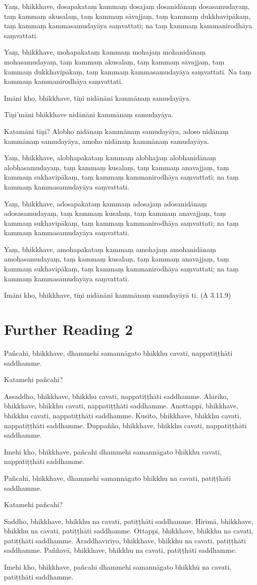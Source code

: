 Yaṃ, bhikkhave, dosapakataṃ kammaṃ dosajaṃ dosanidānaṃ dosasamudayaṃ, taṃ kammaṃ akusalaṃ, taṃ kammaṃ sāvajjaṃ, taṃ kammaṃ dukkhavipākaṃ, taṃ kammaṃ kammasamudayāya saṃvattati; na taṃ kammaṃ kammanirodhāya saṃvattati.

Yaṃ, bhikkhave, mohapakataṃ kammaṃ mohajaṃ mohanidānaṃ mohasamudayaṃ, taṃ kammaṃ akusalaṃ, taṃ kammaṃ sāvajjaṃ, taṃ kammaṃ dukkhavipākaṃ, taṃ kammaṃ kammasamudayāya saṃvattati. Na taṃ kammaṃ kammanirodhāya saṃvattati.

Imāni kho, bhikkhave, tīṇi nidānāni kammānaṃ samudayāya.

Tīṇi’māni bhikkhave nidānāni kammānaṃ samudayāya.

Katamāni tīṇi? Alobho nidānaṃ kammānaṃ samudayāya, adoso nidānaṃ kammānaṃ samudayāya, amoho nidānaṃ kammānaṃ samudayāya.

Yaṃ, bhikkhave, alobhapakataṃ kammaṃ alobhajaṃ alobhanidānaṃ alobhasamudayaṃ, taṃ kammaṃ kusalaṃ, taṃ kammaṃ anavajjaṃ, taṃ kammaṃ sukhavipākaṃ, taṃ kammaṃ kammanirodhāya saṃvattati; na taṃ kammaṃ kammasamudayāya saṃvattati.

Yaṃ, bhikkhave, adosapakataṃ kammaṃ adosajaṃ adosanidānaṃ adosasamudayaṃ, taṃ kammaṃ kusalaṃ, taṃ kammaṃ anavajjaṃ, taṃ kammaṃ sukhavipākaṃ, taṃ kammaṃ kammanirodhāya saṃvattati; na taṃ kammaṃ kammasamudayāya saṃvattati.

Yaṃ, bhikkhave, amohapakataṃ kammaṃ amohajaṃ amohanidānaṃ amohasamudayaṃ, taṃ kammaṃ kusalaṃ, taṃ kammaṃ anavajjaṃ, taṃ kammaṃ sukhavipākaṃ, taṃ kammaṃ kammanirodhāya saṃvattati; na taṃ kammaṃ kammasamudayāya saṃvattati.

Imāni kho, bhikkhave, tīṇi nidānāni kammānaṃ samudayāyā ti. \hfill(A 3.11.9)

\section*{Further Reading 2}

Pañcahi, bhikkhave, dhammehi samannāgato bhikkhu cavati, nappatiṭṭhāti saddhamme.

Katamehi pañcahi?

Assaddho, bhikkhave, bhikkhu cavati, nappatiṭṭhāti saddhamme. Ahiriko, bhikkhave, bhikkhu cavati, nappatiṭṭhāti saddhamme. Anottappī, bhikkhave, bhikkhu cavati, nappatiṭṭhāti saddhamme. Kusīto, bhikkhave, bhikkhu cavati, nappatiṭṭhāti saddhamme. Duppañño, bhikkhave, bhikkhu cavati, nappatiṭṭhāti saddhamme.

Imehi kho, bhikkhave, pañcahi dhammehi samannāgato bhikkhu cavati, nappatiṭṭhāti saddhamme.

Pañcahi, bhikkhave, dhammehi samannāgato bhikkhu na cavati, patiṭṭhāti saddhamme.

Katamehi pañcahi?

Saddho, bhikkhave, bhikkhu na cavati, patiṭṭhāti saddhamme. Hirimā, bhikkhave, bhikkhu na cavati, patiṭṭhāti saddhamme. Ottappī, bhikkhave, bhikkhu na cavati, patiṭṭhāti saddhamme. Āraddhaviriyo, bhikkhave, bhikkhu na cavati, patiṭṭhāti saddhamme. Paññavā, bhikkhave, bhikkhu na cavati, patiṭṭhāti saddhamme.

Imehi kho, bhikkhave, pañcahi dhammehi samannāgato bhikkhū na cavati, patiṭṭhāti saddhamme.